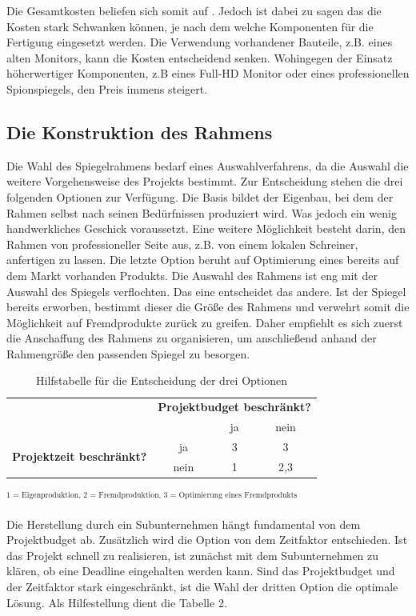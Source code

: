 Die Gesamtkosten beliefen sich somit auf . Jedoch ist dabei zu sagen das die Kosten stark Schwanken können, je nach dem welche Komponenten für die Fertigung eingesetzt werden. Die Verwendung vorhandener Bauteile, z.B. eines alten Monitors, kann die Kosten entscheidend senken. Wohingegen der Einsatz höherwertiger Komponenten, z.B eines Full-HD Monitor oder eines professionellen Spionspiegels, den Preis immens steigert.

\subsection{Die Konstruktion des Rahmens}
Die Wahl des Spiegelrahmens bedarf eines Auswahlverfahrens, da die Auswahl die weitere Vorgehensweise des Projekts bestimmt. Zur Entscheidung stehen die drei folgenden Optionen zur Verfügung. Die Basis bildet der Eigenbau, bei dem der Rahmen selbst nach seinen Bedürfnissen produziert wird. Was jedoch ein wenig handwerkliches Geschick voraussetzt. Eine weitere Möglichkeit besteht darin, den Rahmen von professioneller Seite aus, z.B. von einem lokalen Schreiner, anfertigen zu lassen. Die letzte Option beruht auf Optimierung eines bereits auf dem Markt vorhanden Produkts. Die Auswahl des Rahmens ist eng mit der Auswahl des Spiegels verflochten. Das eine entscheidet das andere. Ist der Spiegel bereits erworben, bestimmt dieser die Größe des Rahmens und verwehrt somit die Möglichkeit auf Fremdprodukte zurück zu greifen. Daher empfiehlt es sich zuerst die Anschaffung des Rahmens zu organisieren, um anschließend anhand der Rahmengröße den passenden Spiegel zu besorgen.  
\begin{table}
	\begin{tabular}{rc|cc}
		& \multicolumn{3}{r}{\textbf{Projektbudget beschränkt?}} \\
		& & ja & nein \\
		\hline
		\multirow{2}{*}{\textbf{Projektzeit beschränkt?}} & ja  & 3 & 3 \\
		& nein & 1 & 2,3 \\
	\end{tabular}
	\caption{Hilfstabelle für die Entscheidung der drei Optionen}
	$ 
	^{\textrm{1 = Eigenproduktion, 2 = Fremdproduktion, 3 = Optimierung eines Fremdprodukts}}
	$
\end{table}
Die Herstellung durch ein Subunternehmen hängt fundamental von dem Projektbudget ab. Zusätzlich wird die Option von dem Zeitfaktor entschieden. Ist das Projekt schnell zu realisieren, ist zunächst mit dem Subunternehmen zu klären, ob eine Deadline eingehalten werden kann. Sind das Projektbudget und der Zeitfaktor stark eingeschränkt, ist die Wahl der dritten Option die optimale Lösung. Als Hilfestellung dient die Tabelle 2.


